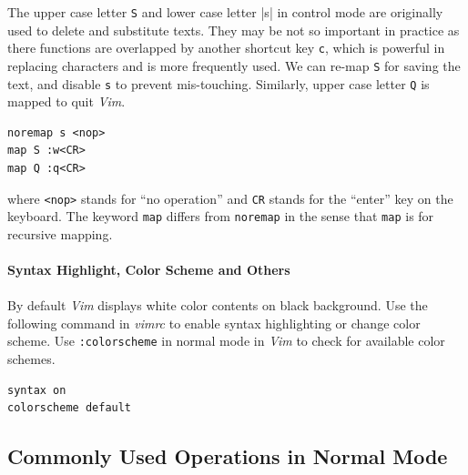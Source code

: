 The upper case letter \verb|S| and lower case letter |s| in control mode are originally used to delete and substitute texts. They may be not so important in practice as there functions are overlapped by another shortcut key \verb|c|, which is powerful in replacing characters and is more frequently used. We can re-map \verb|S| for saving the text, and disable \verb|s| to prevent mis-touching. Similarly, upper case letter \verb|Q| is mapped to quit \textit{Vim}.
\begin{verbatim}
noremap s <nop>
map S :w<CR>
map Q :q<CR>
\end{verbatim}
where \verb|<nop>| stands for ``no operation'' and \verb|CR| stands for the ``enter'' key on the keyboard. The keyword \verb|map| differs from \verb|noremap| in the sense that \verb|map| is for recursive mapping.
\\
\\
\noindent \textbf{Syntax Highlight, Color Scheme and Others}
\\
\\
By default \textit{Vim} displays white color contents on black background. Use the following command in \textit{vimrc} to enable syntax highlighting or change color scheme. Use \verb|:colorscheme| in normal mode in \textit{Vim} to check for available color schemes.
\begin{verbatim}
syntax on
colorscheme default
\end{verbatim}




\subsection{Commonly Used Operations in Normal Mode}



